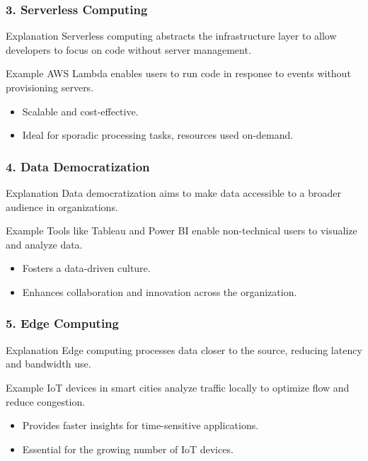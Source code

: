 \documentclass{beamer}
\begin{document}
\begin{frame}[fragile]
    \frametitle{3. Serverless Computing}
    \begin{block}{Explanation}
        Serverless computing abstracts the infrastructure layer to allow developers to focus on code without server management.
    \end{block}
    \begin{exampleblock}{Example}
        AWS Lambda enables users to run code in response to events without provisioning servers.
    \end{exampleblock}
    \begin{itemize}
        \item Scalable and cost-effective.
        \item Ideal for sporadic processing tasks, resources used on-demand.
    \end{itemize}
\end{frame}

\begin{frame}[fragile]
    \frametitle{4. Data Democratization}
    \begin{block}{Explanation}
        Data democratization aims to make data accessible to a broader audience in organizations.
    \end{block}
    \begin{exampleblock}{Example}
        Tools like Tableau and Power BI enable non-technical users to visualize and analyze data.
    \end{exampleblock}
    \begin{itemize}
        \item Fosters a data-driven culture.
        \item Enhances collaboration and innovation across the organization.
    \end{itemize}
\end{frame}

\begin{frame}[fragile]
    \frametitle{5. Edge Computing}
    \begin{block}{Explanation}
        Edge computing processes data closer to the source, reducing latency and bandwidth use.
    \end{block}
    \begin{exampleblock}{Example}
        IoT devices in smart cities analyze traffic locally to optimize flow and reduce congestion.
    \end{exampleblock}
    \begin{itemize}
        \item Provides faster insights for time-sensitive applications.
        \item Essential for the growing number of IoT devices.
    \end{itemize}
\end{frame}
\end{document}

